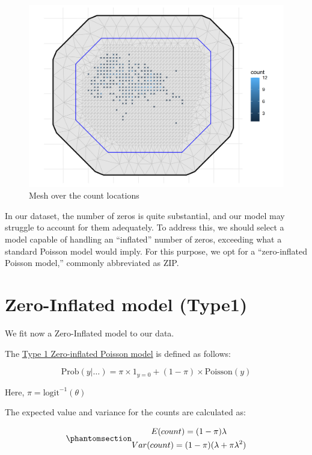 \documentclass[
  letterpaper,
  DIV=11,
  numbers=noendperiod]{scrartcl}
\begin{document}
\begin{figure}[H]

{\centering \includegraphics[width=0.8\linewidth,height=\textheight,keepaspectratio]{day5_practical_8_files/figure-pdf/unnamed-chunk-69-1.png}

}

\caption{Mesh over the count locations}

\end{figure}%

In our dataset, the number of zeros is quite substantial, and our model
may struggle to account for them adequately. To address this, we should
select a model capable of handling an ``inflated'' number of zeros,
exceeding what a standard Poisson model would imply. For this purpose,
we opt for a ``zero-inflated Poisson model,'' commonly abbreviated as
ZIP.

\section{Zero-Inflated model (Type1)}\label{sec-zip}

We fit now a Zero-Inflated model to our data.

The
\href{https://inla.r-inla-download.org/r-inla.org/doc/likelihood/zeroinflated.pdf}{Type
1 Zero-inflated Poisson model} is defined as follows:

\[
\text{Prob}(y\vert\dots)=\pi\times 1_{y=0}+(1-\pi)\times \text{Poisson}(y)
\]

Here, \(\pi=\text{logit}^{-1}(\theta)\)

The expected value and variance for the counts are calculated as:

\begin{equation}\phantomsection\label{eq-mean-zip}{
\begin{gathered}
E(count)=(1-\pi)\lambda \\
Var(count)= (1-\pi)(\lambda+\pi \lambda^2)
\end{gathered}
}\end{equation}
\end{document}
